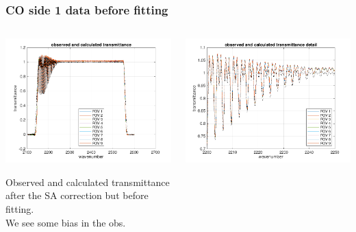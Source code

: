 \documentclass[10pt]{beamer}
\begin{document}
\begin{frame}
\frametitle{CO side 1 data before fitting}
\begin{columns}[t]
\begin{column}{0.5\textwidth}  
  \begin{centering}
  \includegraphics[width=\textwidth]{01-08_pfl_s1_CO/spec_test2_all.png}
  \end{centering}\vspace{3mm}

Observed and calculated transmittance after the SA correction but
before fitting. \\ We see some bias in the obs.

\end{column}

\begin{column}{0.5\textwidth}
  \begin{centering}
  \includegraphics[width=\textwidth]{01-08_pfl_s1_CO/spec_test2_zoom.png}
  \end{centering}\vspace{3mm}


\end{column}
\end{columns}
\end{frame}
\end{document}
